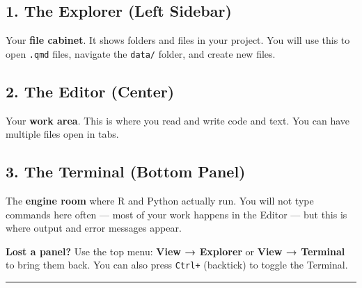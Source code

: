 \documentclass[
  letterpaper,
  DIV=11,
  numbers=noendperiod,
  oneside]{scrreprt}
\begin{document}
\subsection*{1. The Explorer (Left
Sidebar)}\label{the-explorer-left-sidebar}

Your \textbf{file cabinet}. It shows folders and files in your project.
You will use this to open \texttt{.qmd} files, navigate the
\texttt{data/} folder, and create new files.

\subsection*{2. The Editor (Center)}\label{the-editor-center}

Your \textbf{work area}. This is where you read and write code and text.
You can have multiple files open in tabs.

\subsection*{3. The Terminal (Bottom
Panel)}\label{the-terminal-bottom-panel}

The \textbf{engine room} where R and Python actually run. You will not
type commands here often --- most of your work happens in the Editor ---
but this is where output and error messages appear.

\begin{tcolorbox}[enhanced jigsaw, opacitybacktitle=0.6, colbacktitle=quarto-callout-tip-color!10!white, breakable, opacityback=0, coltitle=black, toptitle=1mm, bottomrule=.15mm, colframe=quarto-callout-tip-color-frame, bottomtitle=1mm, colback=white, leftrule=.75mm, rightrule=.15mm, title=\textcolor{quarto-callout-tip-color}{\faLightbulb}\hspace{0.5em}{Tip}, left=2mm, arc=.35mm, toprule=.15mm, titlerule=0mm]

\textbf{Lost a panel?} Use the top menu: \textbf{View → Explorer} or
\textbf{View → Terminal} to bring them back. You can also press
\texttt{Ctrl+\textasciigrave{}} (backtick) to toggle the Terminal.

\end{tcolorbox}

\begin{center}\rule{0.5\linewidth}{0.5pt}\end{center}
\end{document}
